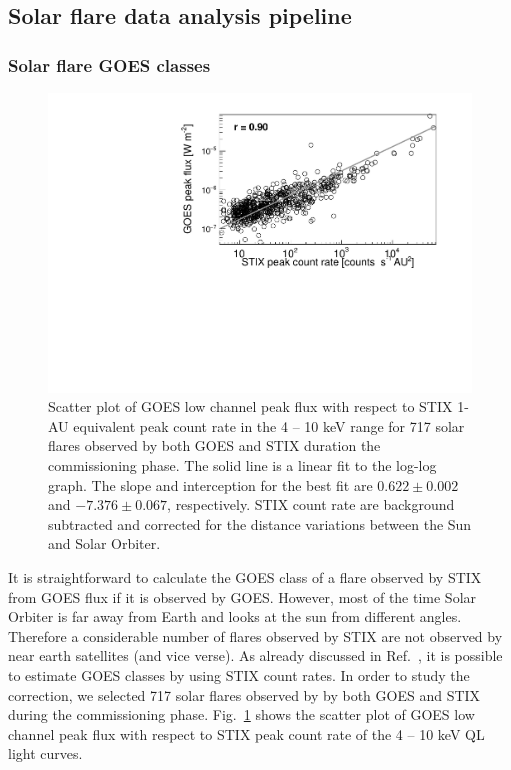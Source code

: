 \documentclass[referee]{aa} %
\begin{document}
\subsection{Solar flare data analysis pipeline}
\subsubsection{Solar flare GOES classes}
\begin{figure}
  \centering
  \includegraphics[width=0.8\linewidth]{figures/goes_stix_flux_paper.pdf}
  \caption{Scatter plot of GOES low channel peak flux with respect to STIX 1-AU equivalent  peak count rate in the 4 -- 10 keV range
  for 717 solar flares observed by both GOES and STIX duration the commissioning phase. 
  The solid line is a linear fit to the log-log graph. 
  The slope and 
  interception for the best fit are $0.622\pm 0.002$ and $-7.376\pm0.067$, respectively.
STIX count rate are background subtracted and corrected for the distance variations between the Sun and Solar Orbiter. 
}
\label{fig:goes-stix}
\end{figure}
It is straightforward to calculate the GOES
class of a flare observed by STIX from GOES flux if it is observed by GOES. 
However,  most of the time Solar Orbiter is far away from Earth and looks at 
the sun from different angles. Therefore a considerable number of flares observed by STIX
 are not observed by near earth satellites (and vice verse). 
As already discussed in Ref.~\cite{andrea2021}, 
it is possible to estimate GOES classes by using STIX count rates.
In order to study the correction, we selected 717 solar flares observed by 
by both GOES  and   STIX during the commissioning phase.   
Fig.~\ref{fig:goes-stix} shows the scatter plot of GOES low channel peak flux with respect to 
STIX peak count rate  of the 4 -- 10 keV QL light curves. 
\end{document}

